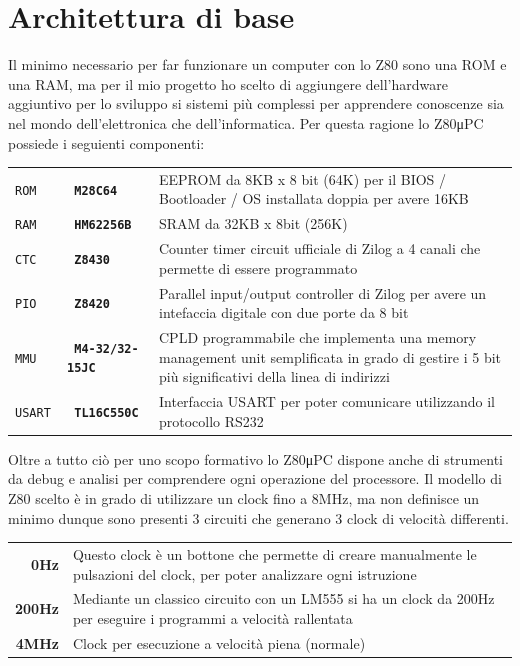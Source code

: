 \documentclass[a4paper, 11pt, twoside]{article}
\newcommand{\prj}{Z80μPC\xspace}
\begin{document}
\section{Architettura di base}
Il minimo necessario per far funzionare un computer con lo Z80 sono una ROM e
una RAM, ma per il mio progetto ho scelto di aggiungere dell'hardware
aggiuntivo per lo sviluppo si sistemi pi\`u complessi per apprendere
conoscenze sia nel mondo dell'elettronica che dell'informatica. Per questa 
ragione lo \prj possiede i seguienti componenti:

\begin{center}
\begin{tabular}{ >{\tt}l >{\tt\bfseries}l p{.7\linewidth} }
    ROM & M28C64    & EEPROM da 8KB x 8 bit (64K) per il BIOS / Bootloader /
                      OS installata doppia per avere 16KB \\
    RAM & HM62256B  & SRAM da 32KB x 8bit (256K) \\
    CTC & Z8430     & Counter timer circuit ufficiale di Zilog a 4 canali che
                      permette di essere programmato \\
    PIO & Z8420     & Parallel input/output controller di Zilog per avere un
                      intefaccia digitale con due porte da 8 bit \\
    MMU & M4-32/32-15JC & CPLD programmabile che implementa una memory 
                          management unit semplificata in grado di gestire i 5
                          bit pi\`u significativi della linea di indirizzi \\
    USART & TL16C550C & Interfaccia USART per poter comunicare utilizzando il
                        protocollo RS232
\end{tabular}
\end{center}

Oltre a tutto ci\`o per uno scopo formativo lo \prj dispone anche di strumenti
da debug e analisi per comprendere ogni operazione del processore. Il modello
di Z80 scelto \`e in grado di utilizzare un clock fino a 8MHz, ma non
definisce un minimo dunque sono presenti 3 circuiti che generano 3 clock di
velocit\`a differenti.

\begin{center}
\begin{tabular}{ >{\bfseries}r p{.8\linewidth} }
    0Hz     & Questo clock \`e un bottone che permette di creare
              manualmente le pulsazioni del clock, per poter analizzare
              ogni istruzione \\
    200Hz   & Mediante un classico circuito con un LM555 si ha un clock da
              200Hz per eseguire i programmi a velocit\`a rallentata \\
    4MHz    & Clock per esecuzione a velocit\`a piena (normale)
\end{tabular}
\end{center}
\end{document}

